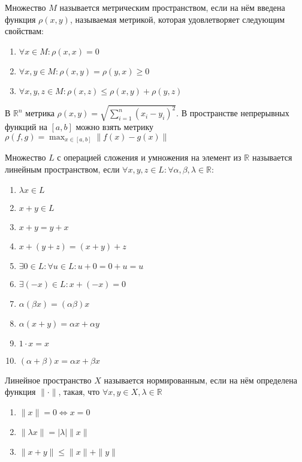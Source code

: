 \documentclass[document.tex]{subfiles}
\begin{document}
\begin{definition}
    Множество $M$ называется метрическим пространством, если на нём введена функция $\rho(x, y)$, называемая метрикой,
    которая удовлетворяет следующим свойствам:
    ~\begin{enumerate}
        \item $\forall x \in M: \rho(x, x) = 0$
        \item $\forall x, y \in M: \rho(x, y) = \rho(y, x) \geq 0$
        \item $\forall x, y, z \in M: \rho(x, z) \leq \rho(x, y) + \rho(y, z)$
    \end{enumerate}
\end{definition}

\begin{example}
    В $\mathbb{R}^n$ метрика $\rho(x, y) = \sqrt{\sum_{i = 1}^n (x_i - y_i)^2}$. В пространстве непрерывных функций на
    $[a, b]$ можно взять метрику $\rho(f, g) = \max_{x \in [a, b]} \|f(x) - g(x)\|$
\end{example}

\begin{definition}
    Множество $L$ с операцией сложения и умножения на элемент из $\mathbb{R}$ называется линейным пространством, если
    $\forall x, y, z \in L: \forall \alpha, \beta, \lambda \in \mathbb{R}$: 
    \begin{enumerate}
        \item $\lambda x \in L$
        \item $x + y \in L$
        \item $x + y = y + x$
        \item $x + (y + z) = (x + y) + z$
        \item $\exists 0 \in L : \forall u \in L: u + 0 = 0 + u = u$
        \item $\exists (-x) \in L : x + (-x) = 0$
        \item $\alpha(\beta x) = (\alpha \beta)x$
        \item $\alpha(x + y) = \alpha x + \alpha y$
        \item $1 \cdot x = x$
        \item $(\alpha + \beta)x = \alpha x + \beta x$
    \end{enumerate}
\end{definition}

\begin{definition}
    Линейное пространство $X$ называется нормированным, если на нём определена функция $\| \cdot \|$, такая, что
    $\forall x, y \in X, \lambda \in \mathbb{R}$
    \begin{enumerate}
        \item $\|x\| = 0 \Leftrightarrow x = 0$
        \item $\|\lambda x\| = |\lambda| \|x\|$
        \item $\|x + y\| \leq \|x\| + \|y\|$
    \end{enumerate}
\end{definition}
\end{document}
